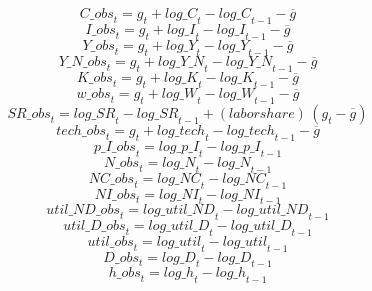 \begin{dmath}
{C\_obs}_{t}={{g}}_{t}+{log\_C}_{t}-{log\_C}_{t-1}-{{\overline{g}}}
\end{dmath}
\begin{dmath}
{I\_obs}_{t}={{g}}_{t}+{log\_I}_{t}-{log\_I}_{t-1}-{{\overline{g}}}
\end{dmath}
\begin{dmath}
{Y\_obs}_{t}={{g}}_{t}+{log\_Y}_{t}-{log\_Y}_{t-1}-{{\overline{g}}}
\end{dmath}
\begin{dmath}
{Y\_N\_obs}_{t}={{g}}_{t}+{log\_Y\_N}_{t}-{log\_Y\_N}_{t-1}-{{\overline{g}}}
\end{dmath}
\begin{dmath}
{K\_obs}_{t}={{g}}_{t}+{log\_K}_{t}-{log\_K}_{t-1}-{{\overline{g}}}
\end{dmath}
\begin{dmath}
{w\_obs}_{t}={{g}}_{t}+{log\_W}_{t}-{log\_W}_{t-1}-{{\overline{g}}}
\end{dmath}
\begin{dmath}
{SR\_obs}_{t}={log\_SR}_{t}-{log\_SR}_{t-1}+{(labor share)}\, \left({{g}}_{t}-{{\overline{g}}}\right)
\end{dmath}
\begin{dmath}
{tech\_obs}_{t}={{g}}_{t}+{log\_tech}_{t}-{log\_tech}_{t-1}-{{\overline{g}}}
\end{dmath}
\begin{dmath}
{p\_I\_obs}_{t}={log\_p\_I}_{t}-{log\_p\_I}_{t-1}
\end{dmath}
\begin{dmath}
{N\_obs}_{t}={log\_N}_{t}-{log\_N}_{t-1}
\end{dmath}
\begin{dmath}
{NC\_obs}_{t}={log\_NC}_{t}-{log\_NC}_{t-1}
\end{dmath}
\begin{dmath}
{NI\_obs}_{t}={log\_NI}_{t}-{log\_NI}_{t-1}
\end{dmath}
\begin{dmath}
{util\_ND\_obs}_{t}={log\_util\_ND}_{t}-{log\_util\_ND}_{t-1}
\end{dmath}
\begin{dmath}
{util\_D\_obs}_{t}={log\_util\_D}_{t}-{log\_util\_D}_{t-1}
\end{dmath}
\begin{dmath}
{util\_obs}_{t}={log\_util}_{t}-{log\_util}_{t-1}
\end{dmath}
\begin{dmath}
{D\_obs}_{t}={log\_D}_{t}-{log\_D}_{t-1}
\end{dmath}
\begin{dmath}
{h\_obs}_{t}={log\_h}_{t}-{log\_h}_{t-1}
\end{dmath}
